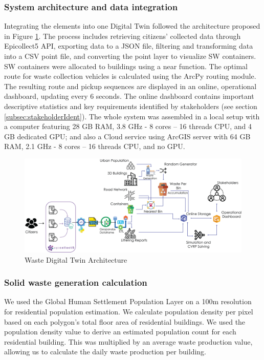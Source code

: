 \documentclass[authoryear,preprint,review,doubleblind, 12pt]{elsarticle}
\begin{document}
    \subsubsection{System architecture and data integration}\label{subsubsec:SystemArch}
    Integrating the elements into one Digital Twin followed the architecture proposed in Figure \ref{fig:architecture}. The process includes retrieving citizens' collected data through Epicollect5 API, exporting data to a JSON file, filtering and transforming data into a CSV point file, and converting the point layer to visualize SW containers. SW containers were allocated to buildings using a near function. The optimal route for waste collection vehicles is calculated using the ArcPy routing module. The resulting route and pickup sequences are displayed in an online, operational dashboard, updating every 6 seconds. The online dashboard contains important descriptive statistics and key requirements identified by stakeholders (see section \ref{subsec:stakeholderIdent}). The whole system was assembled in a local setup with a computer featuring 28 GB RAM, 3.8 GHz - 8 cores – 16 threads CPU, and 4 GB dedicated GPU; and also a  Cloud service using  ArcGIS server
with 64 GB RAM, 2.1 GHz - 8 cores – 16 threads CPU, and no GPU.


    
       \begin{figure}[h]
       \centering
    \includegraphics[width=1.2\textwidth]{Figures/System Architecture.png}
        \caption{Waste Digital Twin Architecture}
        \label{fig:architecture}
    \end{figure}

    \subsubsection{Solid waste generation calculation} \label{subsubsec:Generation}
    We used the Global Human Settlement Population Layer \citep{Schiavina2022} on a 100m resolution for residential population estimation. We calculate population density per pixel based on each polygon's total floor area of residential buildings. We used the population density value to derive an estimated population count for each residential building. This was multiplied by an average waste production value, allowing us to calculate the daily waste production per building.
   
\end{document}
